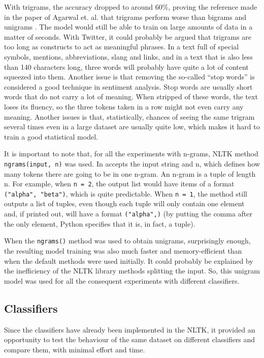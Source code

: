 With trigrams, the accuracy dropped to around 60\%, proving the reference made in the paper of Agarwal et. al. that trigrams perform worse than bigrams and unigrams \cite{agarwal2011sentiment}. The model would still be able to train on large amounts of data in a matter of seconds. With Twitter, it could probably be argued that trigrams are too long as constructs to act as meaningful phrases. In a text full of special symbols, mentions, abbreviations, slang and links, and in a text that is also less than 140 characters long, three words will probably have quite a lot of content squeezed into them. Another issue is that removing the so-called ``stop words'' is considered a good technique in sentiment analysis. Stop words are usually short words that do not carry a lot of meaning. When stripped of these words, the text loses its fluency, so the three tokens taken in a row might not even carry any meaning. Another issues is that, statistically, chances of seeing the same trigram several times even in a large dataset are usually quite low, which makes it hard to train a good statistical model.

It is important to note that, for all the experiments with n-grams, NLTK method \\ \texttt{ngrams(input, n)} was used. In accepts the input string and n, which defines how many tokens there are going to be in one n-gram. An n-gram is a tuple of length n. For example, when \texttt{n = 2}, the output list would have items of a format \texttt{("alpha", "beta")}, which is quite predictable. When \texttt{n = 1}, the method still outputs a list of tuples, even though each tuple will only contain one element and, if printed out, will have a format \texttt{("alpha",)} (by putting the comma after the only element, Python specifies that it is, in fact, a tuple). 

When the \texttt{ngrams()} method was used to obtain unigrams, surprisingly enough, the resulting model training was also much faster and memory-efficient than when the default methods were used initially. It could probably be explained by the inefficiency of the NLTK library methods splitting the input. So, this unigram model was used for all the consequent experiments with different classifiers. 

\subsection{Classifiers}
Since the classifiers have already been implemented in the NLTK, it provided an opportunity to test the behaviour of the same dataset on different classifiers and compare them, with minimal effort and time. 

